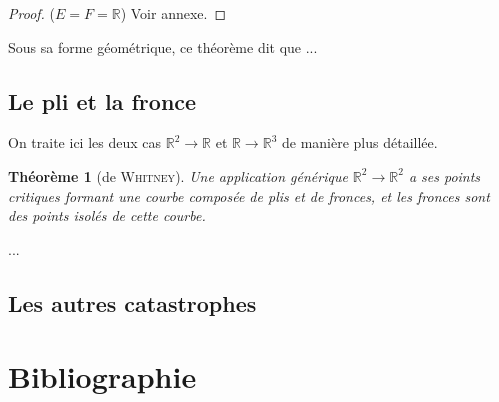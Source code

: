 \documentclass{article}
\newcommand{\R}{\mathbb{R}}
\newtheorem{thm}{Théorème}
\theoremstyle{definition}
\begin{document}
\begin{proof}{($E=F=\R$)} Voir annexe. \end{proof}

Sous sa forme géométrique, ce théorème dit que ...

\subsection{Le pli et la fronce}

On traite ici les deux cas $\R^2\to\R$ et $\R\to\R^3$ de manière plus détaillée.

\begin{thm}[de \textsc{Whitney}]
	Une application générique $\R^2\to\R^2$ a ses points critiques formant une courbe composée de plis et de fronces, et les fronces sont des points isolés de cette courbe.
\end{thm}

...

\iffalse
On note qu'une variété de dimension $1$ est négligeable dans un espace de dimension deux: on en déduit le théorème de \textsc{Sard} dans ce cas particulier.
\fi

\subsection{Les autres catastrophes}

\section{Bibliographie}

\renewcommand\refname{\vskip -1cm}


\end{document}

